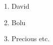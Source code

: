 \documentclass{article}
\begin{document}
	\begin{enumerate}
		\item David
		\item Bolu
		\item Precious etc.
       	\end{enumerate}
\end{document}
